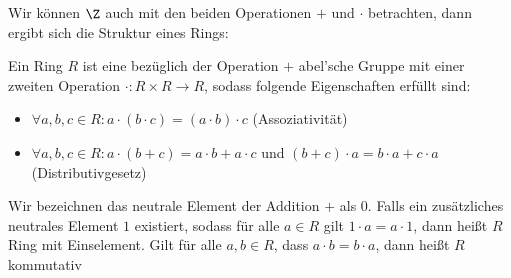 \documentclass[letterpaper,10pt,english]{jupyterBook}
\begin{document}
Wir können \(\Z\) auch mit den beiden Operationen \(+\) und \(\cdot\) betrachten, dann ergibt sich die Struktur eines Rings:
\label{grundlagen/zahlensysteme:definition-6}
\begin{definition}{}{}



Ein Ring \(R\) ist eine bezüglich der Operation \(+\) abel’sche Gruppe mit einer zweiten Operation \(\cdot : R \times R \rightarrow R\), sodass folgende Eigenschaften erfüllt sind:
\begin{itemize}
\item {} 
\( \forall a,b,c \in R: a \cdot (b \cdot c) = (a\cdot b) \cdot c\) (Assoziativität)

\item {} 
\( \forall a,b,c \in R: a \cdot (b+c) = a\cdot b + a \cdot c\) und \((b+c) \cdot a = b \cdot a + c \cdot a\) (Distributivgesetz)

\end{itemize}

Wir bezeichnen das neutrale Element der Addition \(+\) als 0.
Falls ein zusätzliches neutrales Element \(1\) existiert, sodass für alle \(a  \in R\) gilt \(1 \cdot a = a \cdot 1\), dann
heißt \(R\) Ring mit Einselement. Gilt für alle \(a, b  \in R\), dass \(a \cdot b = b \cdot a\), dann heißt \(R\) kommutativ
\end{definition}
\end{document}
